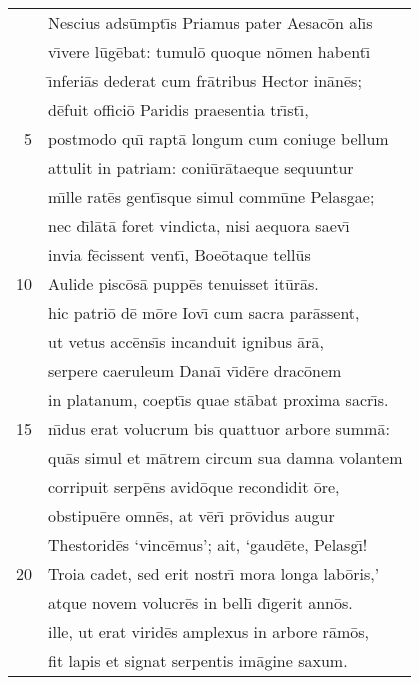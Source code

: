 \documentclass[paper=6in:9in,pagesize=pdftex,
               headinclude=on,footinclude=on,12pt]{scrbook}
\begin{document}

\begin{longtable}[p]{ r l }
 & \indent Nescius ads\=umpt\={\i}s Priamus pater Aesac\=on al\={\i}s\\ 
 & v\={\i}vere l\=ug\=ebat: tumul\=o quoque n\=omen habent\={\i}\\ 
 & \={\i}nferi\=as dederat cum fr\=atribus Hector in\=an\=es;\\ 
 & d\=efuit offici\=o Paridis praesentia tr\={\i}st\={\i},\\ 
5 & postmodo qu\={\i} rapt\=a longum cum coniuge bellum\\ 
 & attulit in patriam: coni\=ur\=ataeque sequuntur\\ 
 & m\={\i}lle rat\=es gent\={\i}sque simul comm\=une Pelasgae;\\ 
 & nec d\={\i}l\=at\=a foret vindicta, nisi aequora saev\={\i}\\ 
 & invia f\=ecissent vent\={\i}, Boe\=otaque tell\=us\\ 
10 & Aulide pisc\=os\=a pupp\=es tenuisset it\=ur\=as.\\ 
 & hic patri\=o d\=e m\=ore Iov\={\i} cum sacra par\=assent,\\ 
 & ut vetus acc\=ens\={\i}s incanduit ignibus \=ar\=a,\\ 
 & serpere caeruleum Dana\={\i} v\={\i}d\=ere drac\=onem\\ 
 & in platanum, coept\={\i}s quae st\=abat proxima sacr\={\i}s.\\ 
15 & n\={\i}dus erat volucrum bis quattuor arbore summ\=a:\\ 
 & qu\=as simul et m\=atrem circum sua damna volantem\\ 
 & corripuit serp\=ens avid\=oque recondidit \=ore,\\ 
 & obstipu\=ere omn\=es, at v\=er\={\i} pr\=ovidus augur\\ 
 & Thestorid\=es `vinc\=emus'; ait, `gaud\=ete, Pelasg\={\i}!\\ 
20 & Troia cadet, sed erit nostr\={\i} mora longa lab\=oris,'\\ 
 & atque novem volucr\=es in bell\={\i} d\={\i}gerit ann\=os.\\ 
 & ille, ut erat virid\=es amplexus in arbore r\=am\=os,\\ 
 & fit lapis et signat serpentis im\=agine saxum.\\ 

\end{longtable}
\end{document}
